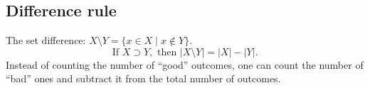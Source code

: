 \subsection{Difference rule}
The set difference: $X \setminus Y = \{x \in X \mid x \notin Y\}$.
\[
\text{If }X \supset Y, \text{ then } |X \setminus Y| = |X| - |Y|.
\]
Instead of counting the number of ``good'' outcomes,
one can count the number of ``bad'' ones and subtract it from the total number of outcomes.
